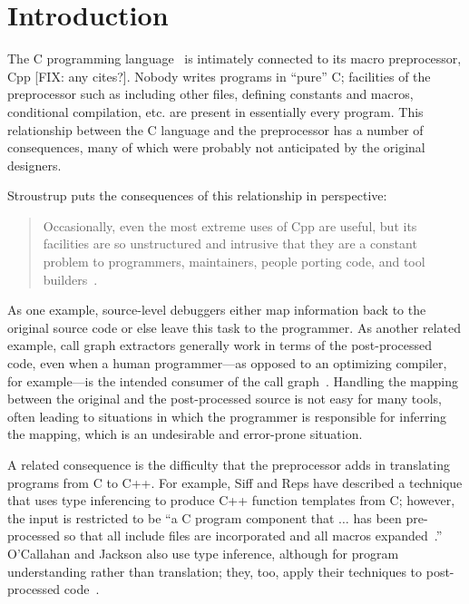 \bigskip

\section{Introduction}

The C programming language~\cite{kr,ansi} is intimately connected to
its macro preprocessor, Cpp [FIX: any cites?].  Nobody writes
programs in ``pure'' C; facilities of the preprocessor such as
including other files, defining constants and macros, conditional
compilation, etc. are present in essentially every program.  This
relationship between the C language and the preprocessor has a number
of consequences, many of which were probably not anticipated by the
original designers.

Stroustrup puts the consequences of this relationship in perspective:
\begin{quote}
Occasionally, even the most extreme uses of Cpp are useful, but its
facilities are so unstructured and intrusive that they are a constant
problem to programmers, maintainers, people porting code, and tool
builders~\cite[p.~424]{Stroustrup-DesignEvolution}.
\end{quote}

As one example, source-level debuggers either map information back to
the original source code or else leave this task to the programmer.
As another related example, call graph extractors generally work in
terms of the post-processed code, even when a human programmer---as
opposed to an optimizing compiler, for example---is the intended
consumer of the call graph~\cite{Murphy-icse18}.  Handling the mapping
between the original and the post-processed source is not easy for many
tools, often leading to situations in which the programmer is
responsible for inferring the mapping, which is an
undesirable and error-prone situation.

A related consequence is the difficulty that the preprocessor adds in
translating programs from C to C++.  For example, Siff and Reps have
described a technique that uses type inferencing to produce C++
function templates from C; however, the input is restricted to be ``a
C program component that $\ldots$ has been pre-processed so that all
include files are incorporated and all macros
expanded~\cite[p.~145]{Siff-fse96}.''  O'Callahan and Jackson also use
type inference, although for program understanding rather than
translation; they, too, apply their techniques to post-processed
code~\cite{OCallahan-icse97}. 

